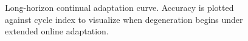 \begin{figure}[t]
\centering
\fbox{\rule{0pt}{1.10in}\rule{0.97\linewidth}{0pt}}
\caption{Long-horizon continual adaptation curve. Accuracy is plotted against cycle index to visualize when degeneration begins under extended online adaptation.}
\label{fig:lifelong}
\end{figure}
